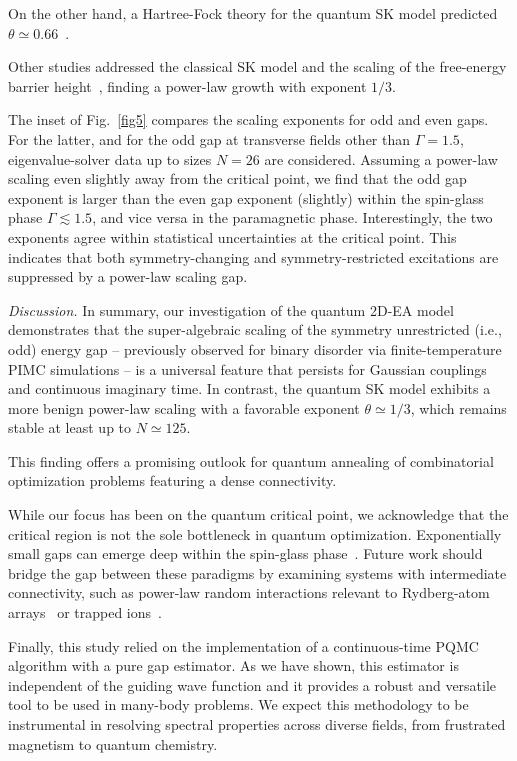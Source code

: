 \documentclass[aps,prl,twocolumn,superscriptaddress,nofootinbib]{revtex4-2}
\begin{document}
On the other hand, a Hartree-Fock theory for the quantum SK model predicted $\theta \simeq 0.66$~\cite{PhysRevB.93.134202}.

Other studies addressed the classical SK model and the scaling of the free-energy barrier height~\cite{Bittner2006,PhysRevE.105.034138,doi:10.1073/pnas.1910936117}, finding a power-law growth with exponent $1/3$.


The inset of Fig.~\ref{fig5} compares the scaling exponents for odd and even gaps. For the latter, and for the odd gap at transverse fields other than $\Gamma=1.5$, eigenvalue-solver data up to sizes $N=26$ are considered. Assuming a power-law scaling even slightly away from the critical point, we find that the odd gap exponent is larger than the even gap exponent (slightly) within the spin-glass phase $\Gamma \lesssim 1.5$, and vice versa in the paramagnetic phase. Interestingly, the two exponents agree within statistical uncertainties at the critical point. This indicates that both symmetry-changing and symmetry-restricted excitations are suppressed by a power-law scaling gap.


\emph{Discussion.}
In summary, our investigation of the quantum 2D-EA model demonstrates that the super-algebraic scaling of the symmetry unrestricted (i.e., odd) energy gap -- previously observed for binary disorder via finite-temperature PIMC simulations -- is a universal feature that persists for Gaussian couplings and continuous imaginary time. In contrast, the quantum SK model exhibits a more benign power-law scaling with a favorable exponent $\theta \simeq 1/3$, which remains stable at least up to $N \simeq 125$.

This finding offers a promising outlook for quantum annealing of combinatorial optimization problems featuring a dense connectivity.

While our focus has been on the quantum critical point, we acknowledge that the critical region is not the sole bottleneck in quantum optimization. Exponentially small gaps can emerge deep within the spin-glass phase~\cite{knysh2015computational}. Future work should bridge the gap between these paradigms by examining systems with intermediate connectivity, such as power-law random interactions relevant to Rydberg-atom arrays~\cite{r6dq-2ztr} or trapped ions~\cite{Smith2016}.

Finally, this study relied on the implementation of a continuous-time PQMC algorithm with a pure gap estimator. As we have shown, this estimator is independent of the guiding wave function  and it provides  a robust and versatile tool  to be used in many-body problems. We expect this methodology to be instrumental in resolving spectral properties across diverse fields, from frustrated magnetism to quantum chemistry.
\end{document}
